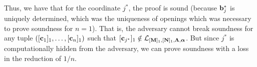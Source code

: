 Thus, we have that for the coordinate $j^*$, the proof is sound (because $\mathbf{b}_j^*$ is uniquely determined, which was the uniqueness of openings which was necessary to prove soundness for $n=1$). That is, the adversary cannot break soundness for any tuple $([\mathbf{c}_1]_1,\ldots, [\mathbf{c}_n]_1)$ such that $[\mathbf{c}_{j^*}]_1 \notin \mathcal{L}_{[\mathbf{{M}}]_1,[\mathbf{{N}}]_1,\mathbf{{\Lambda}},{\boldsymbol \alpha}}$. But since $j^*$ is computationally hidden 
from the adversary, we can prove soundness with a loss in the reduction of $1/n$. 



